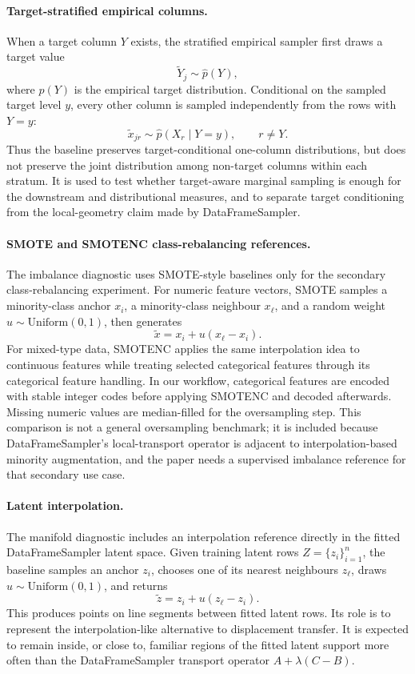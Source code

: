 \paragraph{Target-stratified empirical columns.}
When a target column $Y$ exists, the stratified empirical sampler first draws a
target value
\[
  \widetilde{Y}_j \sim \widehat{p}(Y),
\]
where $\widehat{p}(Y)$ is the empirical target distribution. Conditional on the
sampled target level $y$, every other column is sampled independently from the
rows with $Y=y$:
\[
  \widetilde{x}_{jr}
  \sim
  \widehat{p}(X_r \mid Y=y),
  \qquad r\ne Y.
\]
Thus the baseline preserves target-conditional one-column distributions, but
does not preserve the joint distribution among non-target columns within each
stratum. It is used to test whether target-aware marginal sampling is enough
for the downstream and distributional measures, and to separate target
conditioning from the local-geometry claim made by DataFrameSampler.

\paragraph{SMOTE and SMOTENC class-rebalancing references.}
The imbalance diagnostic uses SMOTE-style baselines only for the secondary
class-rebalancing experiment. For numeric feature vectors, SMOTE samples a
minority-class anchor $x_i$, a minority-class neighbour $x_\ell$, and a random
weight $u\sim\mathrm{Uniform}(0,1)$, then generates
\[
  \widetilde{x}=x_i + u(x_\ell-x_i).
\]
For mixed-type data, SMOTENC applies the same interpolation idea to continuous
features while treating selected categorical features through its categorical
feature handling. In our workflow, categorical features are encoded with stable
integer codes before applying SMOTENC and decoded afterwards. Missing numeric
values are median-filled for the oversampling step. This comparison is not a
general oversampling benchmark; it is included because DataFrameSampler's
local-transport operator is adjacent to interpolation-based minority
augmentation, and the paper needs a supervised imbalance reference for that
secondary use case.

\paragraph{Latent interpolation.}
The manifold diagnostic includes an interpolation reference directly in the
fitted DataFrameSampler latent space. Given training latent rows
$Z=\{z_i\}_{i=1}^n$, the baseline samples an anchor $z_i$, chooses one of its
nearest neighbours $z_\ell$, draws $u\sim\mathrm{Uniform}(0,1)$, and returns
\[
  \widetilde{z}=z_i+u(z_\ell-z_i).
\]
This produces points on line segments between fitted latent rows. Its role is
to represent the interpolation-like alternative to displacement transfer. It
is expected to remain inside, or close to, familiar regions of the fitted
latent support more often than the DataFrameSampler transport operator
$A+\lambda(C-B)$.

